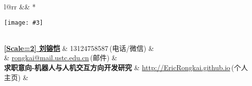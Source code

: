 \newcommand{\paint}[3]{
    \begin{minipage}{#1}
        \texttt{[image: \#3]}
    \end{minipage} 
}
\newcommand{\myheader}{
\begin{tabular*}{\textwidth}{l@{\extracolsep{\fill}}rr}
  && \multirow{4}*{\paint{2.5cm}{3cm}{./image.jpg}}\\
  \specialrule{0em}{0pt}{0pt}
  \textbf{\href{http://EricRongkai.github.io}{\CJKfontspec{微软雅黑}[Scale=2] 刘镕恺}} & 13124758587$\,${\color{labelgrey}(电话/微信)} &\\
   & \href{mailto:zhangzc@pku.edu.cn}{rongkai@mail.ustc.edu.cn}$\,${\color{labelgrey}(邮件)} & \\
   \textbf{求职意向-机器人与人机交互方向开发研究} \quad& \href{mailto:zhangzc@pku.edu.cn}{http://EricRongkai.github.io}$\, ${\color{labelgrey}(个人主页)} & \\
  \end{tabular*}\\\vspace{0.1in}
}

\myheader


